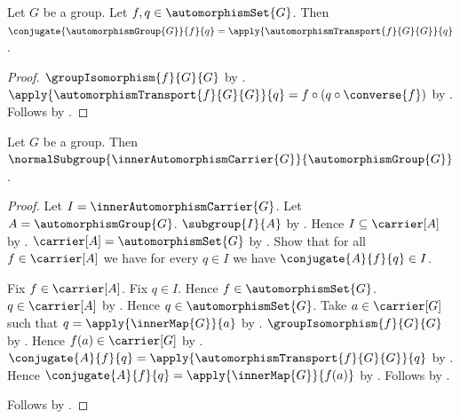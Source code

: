\begin{proposition}\label{automorphism_group_conjugate_is_transport}
    Let $G$ be a group.
    Let $f,q\in\automorphismSet{G}$.
    Then
        $\conjugate{\automorphismGroup{G}}{f}{q}=
            \apply{\automorphismTransport{f}{G}{G}}{q}$.
\end{proposition}
\begin{proof}
    $\groupIsomorphism{f}{G}{G}$ by
        .
    $\apply{\automorphismTransport{f}{G}{G}}{q}=
        f\circ(q\circ\converse{f})$ by
        .
    Follows by .
\end{proof}

\begin{theorem}\label{inner_automorphism_carrier_normal}
    Let $G$ be a group.
    Then
        $\normalSubgroup
            {\innerAutomorphismCarrier{G}}
            {\automorphismGroup{G}}$.
\end{theorem}
\begin{proof}
    Let $I=\innerAutomorphismCarrier{G}$.
    Let $A=\automorphismGroup{G}$.
    $\subgroup{I}{A}$ by
        .
    Hence $I\subseteq\carrier[A]$ by .
    $\carrier[A]=\automorphismSet{G}$ by
        .
    Show that for all $f\in\carrier[A]$ we have for every $q\in I$
        we have $\conjugate{A}{f}{q}\in I$.
    \begin{subproof}
        Fix $f\in\carrier[A]$.
        Fix $q\in I$.
        Hence $f\in\automorphismSet{G}$.
        $q\in\carrier[A]$ by .
        Hence $q\in\automorphismSet{G}$.
        Take $a\in\carrier[G]$ such that
            $q=\apply{\innerMap{G}}{a}$ by
            .
        $\groupIsomorphism{f}{G}{G}$ by
            .
        Hence $f(a)\in\carrier[G]$ by
            .
        $\conjugate{A}{f}{q}=
            \apply{\automorphismTransport{f}{G}{G}}{q}$ by
            .
        Hence
            $\conjugate{A}{f}{q}=\apply{\innerMap{G}}{f(a)}$ by
            .
        Follows by .
    \end{subproof}
    Follows by .
\end{proof}


